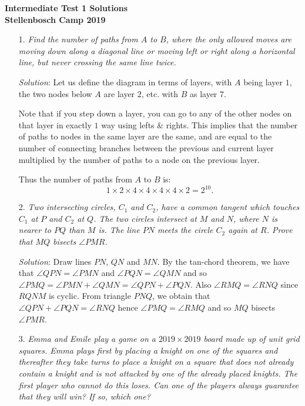\documentclass{article}
\begin{document}
\begin{center}
  \textbf{\Large Intermediate Test 1 Solutions}
  \\ \vspace{1em}
  \textbf{\large Stellenbosch Camp 2019}
\end{center}


\begin{enumerate}[1.]

\item[1.] %
\textit{Find the number of paths from $A$ to $B$, where the only allowed moves are moving down along a diagonal line or moving left or right along a horizontal line, but never crossing the same line twice.}

\textit{Solution}:
Let us define the diagram in terms of layers, with $A$ being layer $1$, the two nodes below $A$ are layer $2$, etc. with $B$ as layer $7$.

Note that if you step down a layer, you can go to any of the other nodes on that layer in exactly $1$ way using lefts \& rights.
This implies that the number of paths to nodes in the same layer are the same, and are equal to the number of connecting branches between the previous and current layer multiplied by the number of paths to a node on the previous layer.

Thus the number of paths from $A$ to $B$ is:
\[ 1 \times 2 \times 4 \times 4 \times 4 \times 4 \times 2 = 2^{10}. \]
\vfill


\item[2.] %
\textit{Two intersecting circles, $C_1$ and $C_2$, have a common tangent which touches $C_1$ at $P$ and $C_2$ at $Q$. The two circles intersect at $M$ and $N$, where $N$ is nearer to $PQ$ than $M$ is. The line $PN$ meets the circle $C_2$ again at $R$. Prove that $MQ$ bisects $\angle PMR$.}

\textit{Solution}:
Draw lines $PN$, $QN$ and $MN$.
By the tan-chord theorem, we have that $\angle QPN=\angle PMN$ and $\angle PQN=\angle QMN$ and so $\angle PMQ=\angle PMN+\angle QMN=\angle QPN+\angle PQN$.
Also $\angle RMQ=\angle RNQ$ since $RQNM$ is cyclic.
From triangle $PNQ$, we obtain that $\angle QPN+\angle PQN= \angle RNQ$ hence $\angle PMQ=\angle RMQ$ and so $MQ$ bisects $\angle PMR$.
\vfill


\item[3.] %
\textit{Emma and Emile play a game on a $2019 \times 2019$ board made up of unit grid squares. Emma plays first by placing a knight on one of the squares and thereafter they take turns to place a knight on a square that does not already contain a knight and is not attacked by one of the already placed knights. The first player who cannot do this loses. Can one of the players always guarantee that they will win? If so, which one? }


\end{enumerate}
\end{document}
